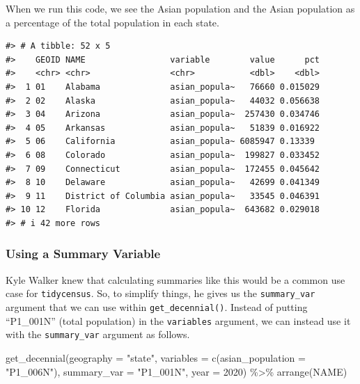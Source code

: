 \documentclass[
]{book}
\newenvironment{Shaded}{\begin{snugshade}}{\end{snugshade}}
\newcommand{\AttributeTok}[1]{\textcolor[rgb]{0.77,0.63,0.00}{#1}}
\newcommand{\DecValTok}[1]{\textcolor[rgb]{0.00,0.00,0.81}{#1}}
\newcommand{\FunctionTok}[1]{\textcolor[rgb]{0.00,0.00,0.00}{#1}}
\newcommand{\NormalTok}[1]{#1}
\newcommand{\SpecialCharTok}[1]{\textcolor[rgb]{0.00,0.00,0.00}{#1}}
\newcommand{\StringTok}[1]{\textcolor[rgb]{0.31,0.60,0.02}{#1}}
\begin{document}
When we run this code, we see the Asian population and the Asian population as a percentage of the total population in each state.

\begin{verbatim}
#> # A tibble: 52 x 5
#>    GEOID NAME                 variable        value      pct
#>    <chr> <chr>                <chr>           <dbl>    <dbl>
#>  1 01    Alabama              asian_popula~   76660 0.015029
#>  2 02    Alaska               asian_popula~   44032 0.056638
#>  3 04    Arizona              asian_popula~  257430 0.034746
#>  4 05    Arkansas             asian_popula~   51839 0.016922
#>  5 06    California           asian_popula~ 6085947 0.13339 
#>  6 08    Colorado             asian_popula~  199827 0.033452
#>  7 09    Connecticut          asian_popula~  172455 0.045642
#>  8 10    Delaware             asian_popula~   42699 0.041349
#>  9 11    District of Columbia asian_popula~   33545 0.046391
#> 10 12    Florida              asian_popula~  643682 0.029018
#> # i 42 more rows
\end{verbatim}

\hypertarget{using-a-summary-variable}{%
\subsubsection*{Using a Summary Variable}\label{using-a-summary-variable}}

Kyle Walker knew that calculating summaries like this would be a common use case for \texttt{tidycensus}. So, to simplify things, he gives us the \texttt{summary\_var} argument that we can use within \texttt{get\_decennial()}. Instead of putting ``P1\_001N'' (total population) in the \texttt{variables} argument, we can instead use it with the \texttt{summary\_var} argument as follows.

\begin{Shaded}
\begin{Highlighting}[]
\FunctionTok{get\_decennial}\NormalTok{(}\AttributeTok{geography =} \StringTok{"state"}\NormalTok{, }
              \AttributeTok{variables =} \FunctionTok{c}\NormalTok{(}\AttributeTok{asian\_population =} \StringTok{"P1\_006N"}\NormalTok{),}
              \AttributeTok{summary\_var =} \StringTok{"P1\_001N"}\NormalTok{,}
              \AttributeTok{year =} \DecValTok{2020}\NormalTok{) }\SpecialCharTok{\%\textgreater{}\%} 
  \FunctionTok{arrange}\NormalTok{(NAME)}
\end{Highlighting}
\end{Shaded}
\end{document}
